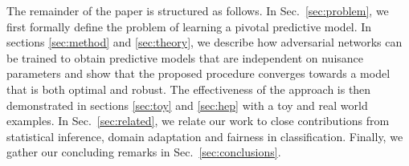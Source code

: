 \documentclass[twocolumn,superscriptaddress,aps]{revtex4-1}
\theoremstyle{plain}
\begin{document}
The remainder of the paper is structured as follows. In Sec.~\ref{sec:problem},
we first formally define the problem of learning a pivotal predictive model. In
sections \ref{sec:method} and \ref{sec:theory}, we describe how adversarial
networks can be trained to obtain predictive models that are independent on
nuisance parameters and show that the proposed procedure converges
towards a model that is both optimal and robust. The  effectiveness of the
approach is then demonstrated in sections \ref{sec:toy} and \ref{sec:hep} with a
toy and real world examples. In Sec.~\ref{sec:related}, we relate our work to
close contributions from statistical inference, domain adaptation and fairness
in classification. Finally, we gather our concluding remarks in
Sec.~\ref{sec:conclusions}.


\end{document}
